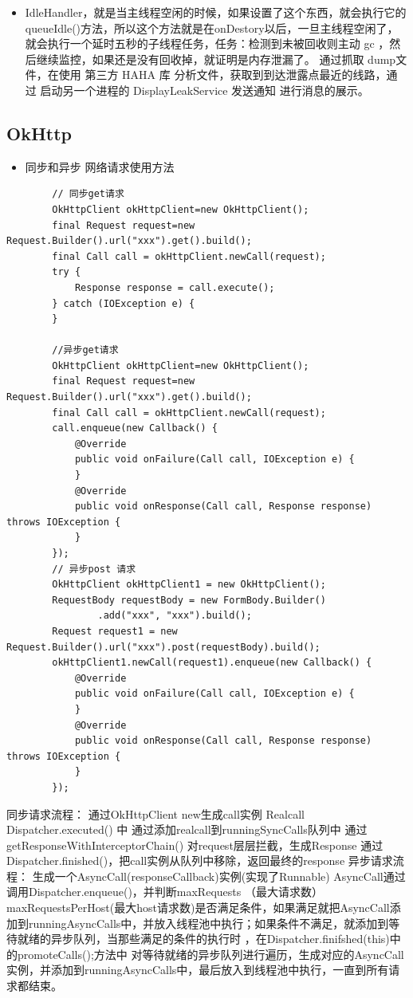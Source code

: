 \documentclass[9pt, b5paper]{article}
\begin{document}
\begin{itemize}
\item IdleHandler，就是当主线程空闲的时候，如果设置了这个东西，就会执行它的queueIdle()方法，所以这个方法就是在onDestory以后，一旦主线程空闲了，就会执行一个延时五秒的子线程任务，任务：检测到未被回收则主动 gc ，然后继续监控，如果还是没有回收掉，就证明是内存泄漏了。 通过抓取 dump文件，在使用 第三方 HAHA 库 分析文件，获取到到达泄露点最近的线路，通过 启动另一个进程的 DisplayLeakService 发送通知 进行消息的展示。
\end{itemize}
\subsection{OkHttp}
\label{sec-9-2}
\begin{itemize}
\item 同步和异步 网络请求使用方法
\end{itemize}
\begin{verbatim}
        // 同步get请求
        OkHttpClient okHttpClient=new OkHttpClient();
        final Request request=new Request.Builder().url("xxx").get().build();
        final Call call = okHttpClient.newCall(request);
        try {
            Response response = call.execute();
        } catch (IOException e) {
        }
        
        //异步get请求 
        OkHttpClient okHttpClient=new OkHttpClient();
        final Request request=new Request.Builder().url("xxx").get().build();
        final Call call = okHttpClient.newCall(request);
        call.enqueue(new Callback() {
            @Override
            public void onFailure(Call call, IOException e) {
            }
            @Override
            public void onResponse(Call call, Response response) throws IOException {
            }
        });
        // 异步post 请求
        OkHttpClient okHttpClient1 = new OkHttpClient();
        RequestBody requestBody = new FormBody.Builder()
                .add("xxx", "xxx").build();
        Request request1 = new Request.Builder().url("xxx").post(requestBody).build();
        okHttpClient1.newCall(request1).enqueue(new Callback() {
            @Override
            public void onFailure(Call call, IOException e) {
            }
            @Override
            public void onResponse(Call call, Response response) throws IOException {
            }
        });
\end{verbatim}
同步请求流程：
通过OkHttpClient new生成call实例 Realcall
Dispatcher.executed() 中 通过添加realcall到runningSyncCalls队列中
通过 getResponseWithInterceptorChain() 对request层层拦截，生成Response
通过Dispatcher.finished()，把call实例从队列中移除，返回最终的response
异步请求流程：
生成一个AsyncCall(responseCallback)实例(实现了Runnable)
AsyncCall通过调用Dispatcher.enqueue()，并判断maxRequests （最大请求数）maxRequestsPerHost(最大host请求数)是否满足条件，如果满足就把AsyncCall添加到runningAsyncCalls中，并放入线程池中执行；如果条件不满足，就添加到等待就绪的异步队列，当那些满足的条件的执行时 ，在Dispatcher.finifshed(this)中的promoteCalls();方法中 对等待就绪的异步队列进行遍历，生成对应的AsyncCall实例，并添加到runningAsyncCalls中，最后放入到线程池中执行，一直到所有请求都结束。
\end{document}
